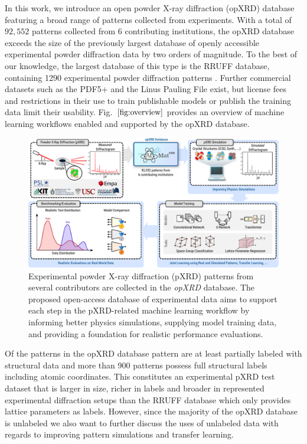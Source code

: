 In this work, we introduce an open powder X-ray diffraction (opXRD) database featuring a broad range of patterns collected from experiments. With a total of $92,552$ patterns collected from 6 contributing institutions, the opXRD database exceeds the size of the previously largest database of openly accessible experimental powder diffraction data by two orders of magnitude. To the best of our knowledge, the largest database of this type is the RRUFF database, containing 1290 experimental powder diffraction patterns \cite{lafuente2015}. Further commercial datasets such as the PDF5+\cite{GatesRector2019} and the Linus Pauling File\cite{villars2018} exist, but license fees and restrictions in their use to train publishable models or publish the training data limit their usability. Fig.~$\eqref{fig:overview}$ provides an overview of machine learning workflows enabled and supported by the opXRD database. \\

\begin{figure}[!htb]
    \centering
    \includegraphics[width=1.0\linewidth]{figures/pipeline.pdf}
    \caption{Experimental powder X-ray diffraction (pXRD) patterns from several contributors are collected in the \textit{opXRD} database. The proposed open-access database of experimental data aims to support each step in the pXRD-related machine learning workflow by informing better physics simulations, supplying model training data, and providing a foundation for realistic performance evaluations.}
    \label{fig:overview}
\end{figure}

Of the \numpatterns patterns in the opXRD database \numlabeled pattern are at least partially labeled with structural data and more than 900 patterns possess full structural labels including atomic coordinates. This constitutes an experimental pXRD test dataset that is larger in size, richer in labels and broader in represented experimental diffraction setups than the RRUFF database which only provides lattice parameters as labels\cite{Armbruster2015}. However, since the majority of the opXRD database is unlabeled we also want to further discuss the uses of unlabeled data with regards to improving pattern simulations and transfer learning. \\

